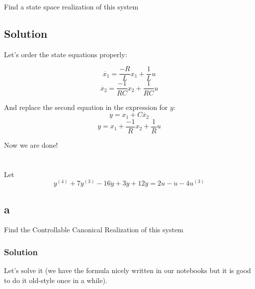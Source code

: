 \documentclass[10pt,a4paper]{article}
\begin{document}
Find a state space realization of this system

\subsection*{Solution}
Let's order the state equations properly:

\[ \dot{x_{1}} = \frac{-R}{L}x_{1} + \frac{1}{L}u  \]
\[ \dot{x_{2}} = \frac{-1}{RC}x_{2} + \frac{1}{RC}u  \]

And replace the second equation in the expression for $y$:
\[ y = x_{1} +  C\dot{x_{2}} \]
\[ y = x_{1} +  \frac{-1}{R}x_{2} + \frac{1}{R}u \]

Now we are done!
\begin{center}
\end{center}

\begin{center}
\end{center}



\section{}
Let
\[ y^{(4)} + 7y^{(3)} - 16\ddot{y} + 3\dot{y} + 12y = 2u - \dot{u} - 4u^{(3)} \]

\subsection*{a}
Find the Controllable Canonical Realization of this system
\subsubsection*{Solution}
Let's solve it (we have the formula nicely written in our notebooks but it is good to do it old-style once in a while).
\smallskip
\end{document}
